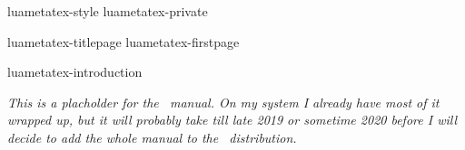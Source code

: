 \environment luametatex-style
\environment luametatex-private

\startdocument
  [manual=LuaMeta\TeX,
   status=experimental,
   version=2.00]

\component luametatex-titlepage
\component luametatex-firstpage

\startfrontmatter
    \component luametatex-introduction
\stopfrontmatter

\startbodymatter

    \startparagraph \em
        This is a placholder for the \LUAMETATEX\ manual. On my system I already
        have most of it wrapped up, but it will probably take till late 2019 or
        sometime 2020 before I will decide to add the whole manual to the
        \CONTEXT\ distribution.
    \stopparagraph


\stopbodymatter

\startbackmatter
\stopbackmatter

\stopdocument
